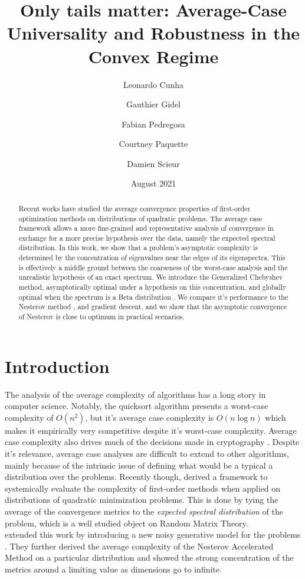 \documentclass{article}
\title{Only tails matter:
Average-Case Universality and Robustness in the Convex Regime}
\author{Leonardo Cunha
\and Gauthier Gidel \\
\and Fabian Pedregosa \\
\and Courtney Paquette \\
\and Damien Scieur}
\date{August 2021}
\begin{document}
\maketitle
\begin{abstract}
    Recent works have studied the average convergence properties of first-order optimization methods on distributions of quadratic problems. 
    The average case framework allows a more fine-grained and representative analysis of convergence in exchange for a more precise hypothesis over the data, namely the expected spectral distribution. 
    In this work, we show that a problem's asymptotic complexity is determined by the concentration of eigenvalues near the edges of its eigenspectra. This is effectively a middle ground between the coarseness of the worst-case analysis and the unrealistic hypothesis of an exact spectrum.
    We introduce the Generalized Chebyshev method, asymptotically optimal under a hypothesis on this concentration, and globally optimal when the spectrum is a Beta distribution .
    We compare it's performance to the Nesterov method \citep{nesterov2003introductory}, and gradient descent, and we show that the asymptotic convergence of Nesterov is close to optimum in practical scenarios.
\end{abstract}
\section{Introduction}
The analysis of the average complexity of algorithms has a long story in computer science. Notably, the quicksort algorithm presents a worst-case complexity of $O(n^2)$, but it's average case complexity is $O(n\log n)$ which makes it  empirically very competitive despite it's worst-case complexity. Average case complexity also drives much of the decisions made in cryptography \citep{bogdanov2006average}.
Despite it's relevance, average case analyses are difficult to extend to other algorithms, mainly because of the intrinsic issue of defining what would be a typical a distribution over the problems. Recently though, \cite{pedregosa2020acceleration}  derived a framework to systemically evaluate the complexity of first-order methods when applied on distributions of quadratic minimization problems. This is done by tying the average of the convergence metrics to the \textit{expected spectral distribution} of the problem, which is a well studied object on Random Matrix Theory. \\
\cite{paquette2020halting}  extended this work by introducing a new noisy generative model for the problems . They further derived the average complexity of the Nesterov Accelerated Method \cite{nesterov2003introductory} on a particular distribution and showed the strong concentration of the metrics around a limiting value as dimensions go to infinite. 
\end{document}
